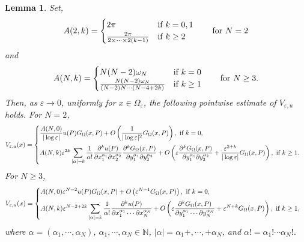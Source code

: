 \documentclass[11pt,reqno]{article}
\newtheorem{lemma}[teo]{Lemma}
\numberwithin{equation}{section}
\newcommand\N{\mathbb N}
\newcommand\e\varepsilon
\renewcommand\O\Omega
\begin{document}
\begin{lemma}\label{into-l:improvedL2Ve}
Set,
\begin{equation}\label{An2}
A(2,k)=
    \begin{cases}
        2\pi&\hbox{if }k=0,1\\
      \frac{2\pi}{2\times \cdots\times2(k-1)} &\hbox{if }k\ge2 
    \end{cases}
    \qquad\hbox{for }N=2 
\end{equation}
and
\begin{equation}\label{An3}
A(N,k)=
    \begin{cases}
       N(N-2)\omega_N&\hbox{if }k=0\\
       \frac{N(N-2)\omega_N}{(N-2)N\cdots(N-4+2k)} &\hbox{if }k\ge1 
    \end{cases}
    \qquad\hbox{for }N\ge3 .
\end{equation}
Then, as $\e\to 0$, uniformly for $x\in\O_\e$, the following pointwise estimate of $V_{\e,u}$  holds.
\vskip0.2cm
                For $N=2$,
                \begin{equation}\label{intoV1}
                \begin{aligned}
                 V_{\e,u}(x)=\begin{cases}
                    \displaystyle \frac{A(N,0)}{|\log \e|}u(P)G_\Omega(x,P)+O\left(\frac{1}{|\log \e|^2}G_\Omega(x,P)\right),\hbox{ if } k=0,\vspace{2mm}\\
                   \displaystyle A(N,k)\e^{2k}
					\sum_{|\alpha|=k}\frac1{\alpha!}
				\frac{\partial^ku(P)}{\partial x_1^{\alpha_1}\partial x_2^{\alpha_2}}\frac{\partial^kG_{\Omega}(x,P)}{\partial y_1^{\alpha_1}\partial y_2^{\alpha_2}}+O\left(\e\frac{\partial^kG_{\Omega}(x,P)}{\partial y_1^{\alpha_1}\partial y_2^{\alpha_2}}+\frac{\e^{2+k}}{|\log \e|}G_{\Omega}(x,P)\right),\hbox{ if }  k\ge 1.
				\end{cases}
                \end{aligned}
				\end{equation}                   
                For $N\ge 3$,
                \begin{equation}
                \begin{aligned}
                 V_{\e,u}(x)=\begin{cases}
                    \displaystyle A(N,0)\e^{N-2}u(P)G_\Omega(x,P)+O\left(\e^{N-1}G_\Omega(x,P)\right),\hbox{ if } k=0,\vspace{2mm}\\
                   \displaystyle A(N,k)\e^{N-2+2k}
					\sum_{|\alpha|=k}\frac1{\alpha!}
					\frac{\partial^ku(P)}{\partial x_1^{\alpha_1}\cdots\partial x_N^{\alpha_N}}+O\left(\e\frac{\partial^kG_{\Omega}(x,P)}{\partial y_1^{\alpha_1}\cdots\partial y_N^{\alpha_N}}+\e^{N+k}G_{\Omega}(x,P)\right),\hbox{ if }  k\ge 1,
				\end{cases}
                \end{aligned}
				\end{equation}
		 where $\alpha=(\alpha_1,\cdots,\alpha_N) $, $\alpha_1,\cdots,\alpha_N\in \N$, $|\alpha|=\alpha_1+,\cdots,+\alpha_N$, and $\alpha!=\alpha_1!\cdots\alpha_N!$.
            \end{lemma}
\end{document}
